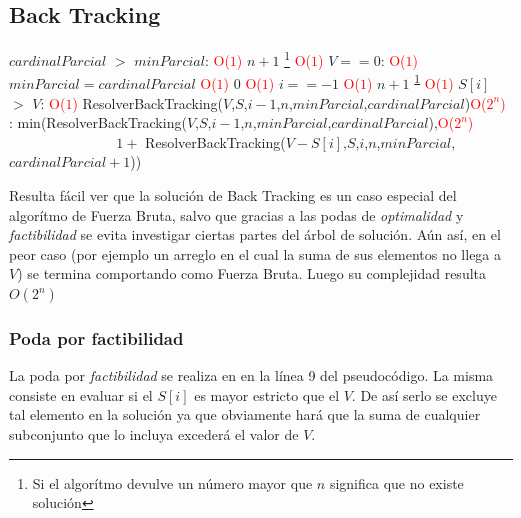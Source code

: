 \subsection{Back Tracking}

\begin{codebox}
    \li \If $cardinalParcial$ $>$ $minParcial$: \textcolor{red}{O($1$)}
        \Then
    \li        \Return $n+1$ \footnote{\label{bktrk}Si el algor\'itmo devulve un n\'umero mayor que $n$ significa que no existe soluci\'on} \End\textcolor{red}{O($1$)}
    \li \If $V == 0$: \textcolor{red}{O($1$)}
         \Then
    \li         $minParcial = cardinalParcial$ \textcolor{red}{O($1$)}
    \li         \Return $0$ \textcolor{red}{O($1$)}
    \End
    \li \If $i == -1$ \textcolor{red}{O($1$)}
        \Then
    \li                 \Return $n+1$ \textsuperscript{\ref{bktrk}} \textcolor{red}{O($1$)}
                \End
    \li \If $S[i]$ $>$ $V$: \textcolor{red}{O($1$)}
        \Then 
    \li         \Return  ResolverBackTracking($V$,$S$,$i-1$,$n$,$minParcial$,$cardinalParcial$)\textcolor{red}{O($2^n$)}
    \li    \Else:
    \li          \Return min(ResolverBackTracking($V$,$S$,$i-1$,$n$,$minParcial$,$cardinalParcial$),\textcolor{red}{O($2^n$)}
                            \\ $\qquad\qquad$$\qquad\quad\,\,$ $1+$ ResolverBackTracking($V-S[i]$,$S$,$i$,$n$,$minParcial$,$cardinalParcial+1$))



    \end{codebox}

\par Resulta f\'acil ver que la soluci\'on de Back Tracking es un caso especial del algor\'itmo de Fuerza Bruta,
salvo que gracias a las podas de \textit{optimalidad} y \textit{factibilidad} se evita investigar ciertas partes del
\'arbol de soluci\'on. A\'un as\'i, en el peor caso (por ejemplo un arreglo en el cual la suma de sus elementos no llega
a $V$) se termina comportando como Fuerza Bruta. Luego su complejidad resulta $O(2^n)$

\subsubsection{Poda por factibilidad}
\par La poda por \textit{factibilidad} se realiza en en la l\'inea 9 del pseudoc\'odigo. La misma consiste en
evaluar si el $S[i]$ es mayor estricto que el $V$. De as\'i serlo se excluye tal elemento en la soluci\'on ya que obviamente
har\'a que la suma de cualquier subconjunto que lo incluya exceder\'a el valor de $V$.


